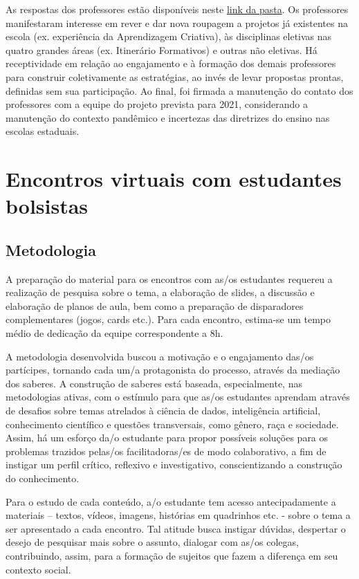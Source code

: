\documentclass[
]{book}
\begin{document}
As respostas dos professores estão disponíveis neste \href{https://pad.riseup.net/p/CDnaEP}{link da pasta}.
Os professores manifestaram interesse em rever e dar nova roupagem a projetos já existentes na escola (ex. experiência da Aprendizagem Criativa), às disciplinas eletivas nas quatro grandes áreas (ex. Itinerário Formativos) e outras não eletivas. Há receptividade em relação ao engajamento e à formação dos demais professores para construir coletivamente as estratégias, ao invés de levar propostas prontas, definidas sem sua participação.
Ao final, foi firmada a manutenção do contato dos professores com a equipe do projeto prevista para 2021, considerando a manutenção do contexto pandêmico e incertezas das diretrizes do ensino nas escolas estaduais.

\hypertarget{encest}{%
\chapter{Encontros virtuais com estudantes bolsistas}\label{encest}}

\hypertarget{metodologia}{%
\section{Metodologia}\label{metodologia}}

A preparação do material para os encontros com as/os estudantes requereu a realização de pesquisa sobre o tema, a elaboração de slides, a discussão e elaboração de planos de aula, bem como a preparação de disparadores complementares (jogos, cards etc.). Para cada encontro, estima-se um tempo médio de dedicação da equipe correspondente a 8h.

A metodologia desenvolvida buscou a motivação e o engajamento das/os partícipes, tornando cada um/a protagonista do processo, através da mediação dos saberes. A construção de saberes está baseada, especialmente, nas metodologias ativas, com o estímulo para que as/os estudantes aprendam através de desafios sobre temas atrelados à ciência de dados, inteligência artificial, conhecimento científico e questões transversais, como gênero, raça e sociedade. Assim, há um esforço da/o estudante para propor possíveis soluções para os problemas trazidos pelas/os facilitadoras/es de modo colaborativo, a fim de instigar um perfil crítico, reflexivo e investigativo, conscientizando a construção do conhecimento.

Para o estudo de cada conteúdo, a/o estudante tem acesso antecipadamente a materiais -- textos, vídeos, imagens, histórias em quadrinhos etc. - sobre o tema a ser apresentado a cada encontro. Tal atitude busca instigar dúvidas, despertar o desejo de pesquisar mais sobre o assunto, dialogar com as/os colegas, contribuindo, assim, para a formação de sujeitos que fazem a diferença em seu contexto social.
\end{document}
